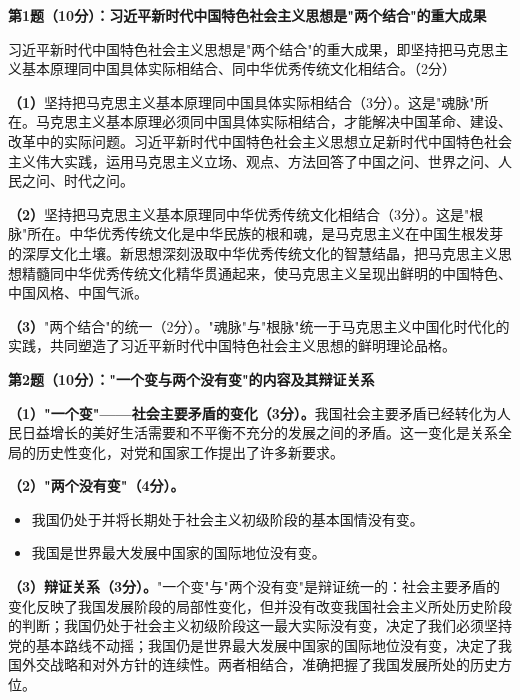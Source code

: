 \documentclass[12pt, a4paper]{article}
\begin{document}
\begin{answerbox}

\textbf{第1题（10分）：习近平新时代中国特色社会主义思想是"两个结合"的重大成果}

习近平新时代中国特色社会主义思想是"两个结合"的重大成果，即坚持把马克思主义基本原理同中国具体实际相结合、同中华优秀传统文化相结合。（2分）

\textbf{（1）}坚持把马克思主义基本原理同中国具体实际相结合（3分）。这是"魂脉"所在。马克思主义基本原理必须同中国具体实际相结合，才能解决中国革命、建设、改革中的实际问题。习近平新时代中国特色社会主义思想立足新时代中国特色社会主义伟大实践，运用马克思主义立场、观点、方法回答了中国之问、世界之问、人民之问、时代之问。

\textbf{（2）}坚持把马克思主义基本原理同中华优秀传统文化相结合（3分）。这是"根脉"所在。中华优秀传统文化是中华民族的根和魂，是马克思主义在中国生根发芽的深厚文化土壤。新思想深刻汲取中华优秀传统文化的智慧结晶，把马克思主义思想精髓同中华优秀传统文化精华贯通起来，使马克思主义呈现出鲜明的中国特色、中国风格、中国气派。

\textbf{（3）}"两个结合"的统一（2分）。"魂脉"与"根脉"统一于马克思主义中国化时代化的实践，共同塑造了习近平新时代中国特色社会主义思想的鲜明理论品格。

\end{answerbox}

\begin{answerbox}

\textbf{第2题（10分）："一个变与两个没有变"的内容及其辩证关系}

\textbf{（1）"一个变"——社会主要矛盾的变化（3分）。}我国社会主要矛盾已经转化为人民日益增长的美好生活需要和不平衡不充分的发展之间的矛盾。这一变化是关系全局的历史性变化，对党和国家工作提出了许多新要求。

\textbf{（2）"两个没有变"（4分）。}
\begin{itemize}[leftmargin=2em,itemsep=1pt]
  \item 我国仍处于并将长期处于社会主义初级阶段的基本国情没有变。
  \item 我国是世界最大发展中国家的国际地位没有变。
\end{itemize}

\textbf{（3）辩证关系（3分）。}"一个变"与"两个没有变"是辩证统一的：社会主要矛盾的变化反映了我国发展阶段的局部性变化，但并没有改变我国社会主义所处历史阶段的判断；我国仍处于社会主义初级阶段这一最大实际没有变，决定了我们必须坚持党的基本路线不动摇；我国仍是世界最大发展中国家的国际地位没有变，决定了我国外交战略和对外方针的连续性。两者相结合，准确把握了我国发展所处的历史方位。

\end{answerbox}
\end{document}

